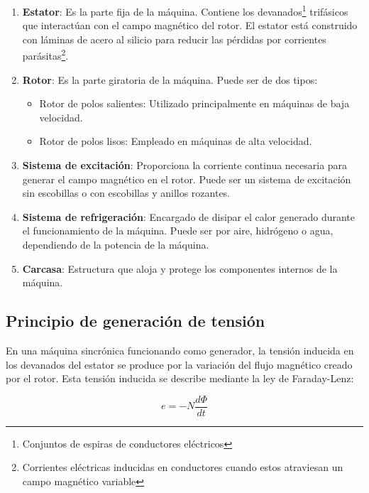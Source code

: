 \documentclass[../main]{subfiles}
\begin{document}
\begin{enumerate}
    \item \textbf{Estator}: Es la parte fija de la máquina. Contiene los devanados\footnote{Conjuntos de espiras de conductores eléctricos} trifásicos que interactúan con el campo magnético del rotor. El estator está construido con láminas de acero al silicio para reducir las pérdidas por corrientes parásitas\footnote{Corrientes eléctricas inducidas en conductores cuando estos atraviesan un campo magnético variable}.
    
    \item \textbf{Rotor}: Es la parte giratoria de la máquina. Puede ser de dos tipos:
    \begin{itemize}
        \item Rotor de polos salientes: Utilizado principalmente en máquinas de baja velocidad.
        \item Rotor de polos lisos: Empleado en máquinas de alta velocidad.
    \end{itemize}
    
    \item \textbf{Sistema de excitación}: Proporciona la corriente continua necesaria para generar el campo magnético en el rotor. Puede ser un sistema de excitación sin escobillas o con escobillas y anillos rozantes.
    
    \item \textbf{Sistema de refrigeración}: Encargado de disipar el calor generado durante el funcionamiento de la máquina. Puede ser por aire, hidrógeno o agua, dependiendo de la potencia de la máquina.
    
    \item \textbf{Carcasa}: Estructura que aloja y protege los componentes internos de la máquina.
\end{enumerate}

\subsection{Principio de generación de tensión}

En una máquina sincrónica funcionando como generador, la tensión inducida en los devanados del estator se produce por la variación del flujo magnético creado por el rotor. Esta tensión inducida se describe mediante la ley de Faraday-Lenz:

\begin{equation}
e = -N \frac{d\Phi}{dt}
\end{equation}
\end{document}
